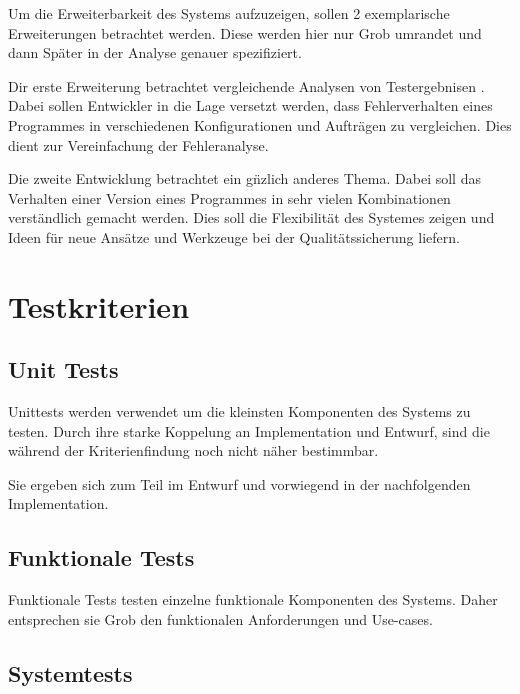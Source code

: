 Um die Erweiterbarkeit des Systems aufzuzeigen,
sollen 2 exemplarische Erweiterungen betrachtet werden.
Diese werden hier nur Grob umrandet und dann Sp\"ater in der Analyse genauer spezifiziert.

Dir erste Erweiterung betrachtet vergleichende Analysen von Testergebnisen .
Dabei sollen Entwickler in die Lage versetzt werden,
dass Fehlerverhalten eines Programmes in verschiedenen Konfigurationen und Auftr\"agen zu vergleichen.
Dies dient zur Vereinfachung der Fehleranalyse.

Die zweite Entwicklung betrachtet ein g\"nzlich anderes Thema.
Dabei soll das Verhalten einer Version eines Programmes
in sehr vielen Kombinationen verst\"andlich gemacht werden.
Dies soll die Flexibilit\"at des Systemes zeigen und
Ideen f\"ur neue Ans\"atze und Werkzeuge bei der Qualit\"atssicherung liefern.





\section{Testkriterien}


\subsection{Unit Tests}

Unittests werden verwendet um die kleinsten Komponenten des Systems zu testen.
Durch ihre starke Koppelung an Implementation und Entwurf,
sind die w\"ahrend der Kriterienfindung noch nicht n\"aher bestimmbar.

Sie ergeben sich zum Teil im Entwurf und vorwiegend in
der nachfolgenden Implementation.

\subsection{Funktionale Tests}

Funktionale Tests testen einzelne funktionale Komponenten des Systems.
Daher entsprechen sie Grob den funktionalen Anforderungen und Use-cases.

\subsection{Systemtests}

